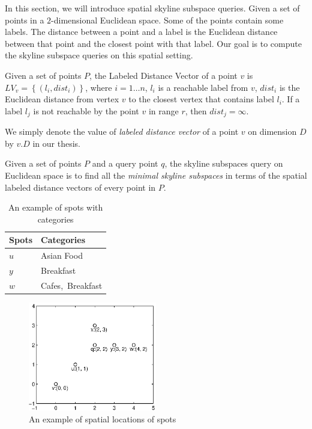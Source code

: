 In this section, we will introduce spatial skyline subspace queries. Given a set of points in a $2$-dimensional Euclidean space. Some of the points contain some labels. The distance between a point and a label is the Euclidean distance between that point and the closest point with that label. Our goal is to compute the skyline subspace queries on this spatial setting.

\begin{definition}
Given a set of points $P$, the Labeled Distance Vector of a point $v$ is $LV_v=\left\{\left(l_i, dist_i\right)\right\}$, where $i = 1 \ldots n$, $l_i$ is a reachable label from $v$, $dist_i$ is the Euclidean distance from vertex $v$ to the closest vertex that contains label $l_i$. If a label $l_j$ is not reachable by the point $v$ in range $r$, then $dist_j = \infty$. 
\end{definition}

We simply denote the value of \emph{labeled distance vector} of a point $v$ on dimension $D$ by $v.D$ in our thesis.

\begin{definition}
Given a set of points $P$ and a query point $q$, the skyline subspaces query on Euclidean space is to find all the \emph{minimal skyline subspaces} in terms of the spatial labeled distance vectors of every point in $P$.
\end{definition}

\begin{table}[H]
    \centering
    \begin{tabular}{|l|l|}
    \hline
    Spots   & Categories \\ \hline
    $u$     & Asian Food     \\ \hline
    $y$     & Breakfast  \\ \hline
    $w$     & Cafes,~Breakfast   \\ \hline
    \end{tabular}
    \caption{An example of spots with categories}
    \label{tab:spot_category} 
\end{table}


\begin{figure}[H]
    \centering
    \includegraphics[width=0.5\textwidth]{figs/spatial_figure}
    \caption{An example of spatial locations of spots}
    \label{fig:spatial_map}
\end{figure}

